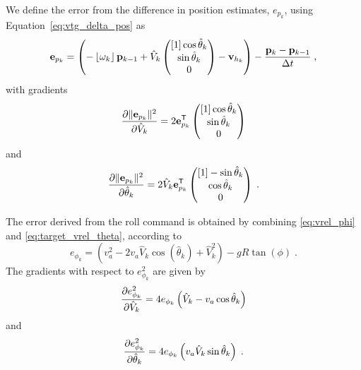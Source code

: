 We define the error from the difference in position estimates, $e_{p_{k}}$, using Equation~\eqref{eq:vtg_delta_pos} as
\begin{equation}
    \e_{p_{k}} = \left(-\skewmat{\angvel_{k}}\p_{k-1} + \hat{V}_k\pmat{\cos\hat{\theta}_k \\ \sin\hat{\theta}_k \\ 0} - \vel_{h_k} \right) - \frac{\p_k - \p_{k-1}}{\Delta t}\;,
\end{equation}
with gradients
\begin{equation}
    \pardd[\norm{\e_{p_{k}}}^2]{\hat{V}_k} = 2\e_{p_{k}}^\transpose \pmat{\cos\hat{\theta}_k \\ \sin\hat{\theta}_k \\ 0}
\end{equation}
and
\begin{equation}
    \pardd[\norm{\e_{p_{k}}}^2]{\hat{\theta}_k} = 2\hat{V}_k\e_{p_{k}}^\transpose \pmat{-\sin\hat{\theta}_k \\ \cos\hat{\theta}_k \\ 0}\;.
\end{equation}

The error derived from the roll command is obtained by combining \eqref{eq:vrel_phi} and \eqref{eq:target_vrel_theta}, according to
\begin{equation}
    e_{\phi_{k}} = \left(v_a^2 - 2v_a \hat{V}_{k} \cos(\hat{\theta}_k) + \hat{V}_{k}^2\right) - gR\tan(\phi) \;.
\end{equation}
The gradients with respect to $e_{\phi_{k}}^2$ are given by
\begin{equation}
    \pardd[e_{\phi_{k}}^2]{\hat{V}_{k}} = 4e_{\phi_{k}}\left(\hat{V}_{k} - v_a\cos\hat{\theta}_k \right)
\end{equation}
and
\begin{equation}
    \pardd[e_{\phi_{k}}^2]{\hat{\theta}_{k}} = 4e_{\phi_{k}}\left(v_a\hat{V}_{k}\sin\hat{\theta}_k \right)\;.
\end{equation}

